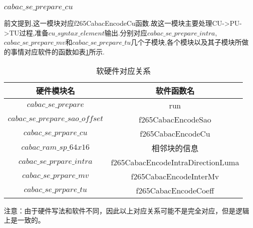 \documentclass[UTF8,a4paper,12pt]{ctexart}
\newcommand{\wuhao}{\fontsize{10.5pt}{10.5pt}\selectfont}
\begin{document}
\subsubsection{$cabac\_se\_prepare\_cu$}
前文提到,这一模块对应f265CabacEncodeCu函数.故这一模块主要处理CU->PU->TU过程,准备$cu\_syntax\_element$输出.分别对应$cabac\_se\_prepare\_intra$, \\
$cabac\_se\_prepare\_mv$和$cabac\_se\_prepare\_tu$几个子模块,各个模块以及其子模块所做的事情对应软件的函数如表\ref{tab5}所示.
\begin{table}[H] \wuhao             %
   \centering
  \caption{软硬件对应关系}\label{tab5}
  \begin{tabular}{c|c}
    \toprule                  %
    硬件模块名 & 软件函数名 \\
    \hline                  %
    $cabac\_se\_prepare$ & run \\
    $cabac\_se\_prepare\_sao\_offset$ & f265CabacEncodeSao \\
    $cabac\_se\_prpare\_cu$ & f265CabacEncodeCu \\
    $cabac\_ram\_sp\_64x16$ & 相邻块的信息 \\
    $cabac\_se\_prpare\_intra$ & f265CabacEncodeIntraDirectionLuma \\
    $cabac\_se\_prpare\_mv$ & f265CabacEncodeInterMv \\
    $cabac\_se\_prpare\_tu$ & f265CabacEncodeCoeff \\
    \bottomrule                %
  \end{tabular}
\end{table}
注意：由于硬件写法和软件不同，因此以上对应关系可能不是完全对应，但是逻辑上是一致的。
\end{document}
